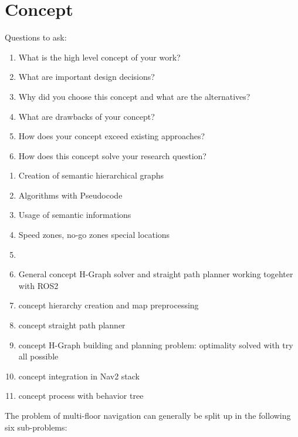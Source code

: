 \chapter{Concept}
\label{sec:concept}
Questions to ask:
\begin{enumerate}
    \item What is the high level concept of your work?
    \item What are important design decisions?
    \item Why did you choose this concept and what are the alternatives?
    \item What are drawbacks of your concept?
    \item How does your concept exceed existing approaches?
    \item How does this concept solve your research question?
\end{enumerate}

\begin{enumerate}
    \item Creation of semantic hierarchical graphs
    \item Algorithms with Pseudocode
    \item Usage of semantic informations
    \item Speed zones, no-go zones special locations
    \item 
    \item General concept H-Graph solver and straight path planner working togehter with ROS2
    \item concept hierarchy creation and map preprocessing
    \item concept straight path planner
    \item concept H-Graph building and planning problem: optimality solved with try all possible
    \item concept integration in Nav2 stack
    \item concept process with behavior tree
\end{enumerate}

The problem of multi-floor navigation can generally be split up in the following six sub-problems:

